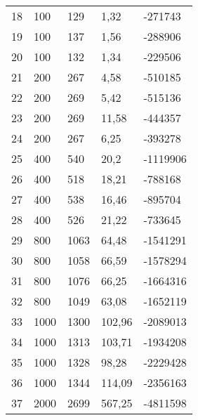 \begin{longtable}{lllll}
    18               & 100            & 129            & 1,32        & -271743         \\
    19               & 100            & 137            & 1,56        & -288906         \\
    20               & 100            & 132            & 1,34        & -229506         \\
    21               & 200            & 267            & 4,58        & -510185         \\
    22               & 200            & 269            & 5,42        & -515136         \\
    23               & 200            & 269            & 11,58       & -444357         \\
    24               & 200            & 267            & 6,25        & -393278         \\
    25               & 400            & 540            & 20,2        & -1119906        \\
    26               & 400            & 518            & 18,21       & -788168         \\
    27               & 400            & 538            & 16,46       & -895704         \\
    28               & 400            & 526            & 21,22       & -733645         \\
    29               & 800            & 1063           & 64,48       & -1541291        \\
    30               & 800            & 1058           & 66,59       & -1578294        \\
    31               & 800            & 1076           & 66,25       & -1664316        \\
    32               & 800            & 1049           & 63,08       & -1652119        \\
    33               & 1000           & 1300           & 102,96      & -2089013        \\
    34               & 1000           & 1313           & 103,71      & -1934208        \\
    35               & 1000           & 1328           & 98,28       & -2229428        \\
    36               & 1000           & 1344           & 114,09      & -2356163        \\
    37               & 2000           & 2699           & 567,25      & -4811598        \\

\end{longtable}
